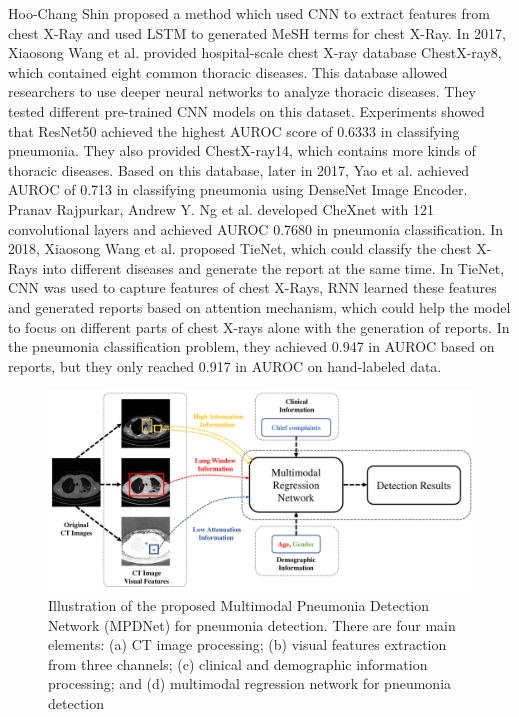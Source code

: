 \documentclass[journal]{IEEEtran}
\begin{document}
Hoo-Chang Shin \cite{Shin2016Learning} proposed a method which used CNN to extract features from chest X-Ray and used LSTM \cite{hochreiter1997long} to generated MeSH \cite{timmurphy.org} terms for chest X-Ray. In 2017, Xiaosong Wang et al. \cite{Wang2017ChestX} provided hospital-scale chest X-ray database ChestX-ray8, which contained eight common thoracic diseases. This database allowed researchers to use deeper neural networks to analyze thoracic diseases. They tested different pre-trained CNN models on this dataset. Experiments showed that ResNet50 achieved the highest AUROC score of 0.6333 in classifying pneumonia. They also provided ChestX-ray14, which contains more kinds of thoracic diseases.
Based on this database, later in 2017, Yao et al. \cite{yao2017learning} achieved AUROC of 0.713 in classifying pneumonia using DenseNet Image Encoder. Pranav Rajpurkar, Andrew Y. Ng et al. \cite{Rajpurkar2017CheXNet} developed CheXnet with 121 convolutional layers and achieved AUROC 0.7680 in pneumonia classification.
In 2018, Xiaosong Wang et al. \cite{Wang2018TieNet} proposed TieNet, which could classify the chest X-Rays into different diseases and generate the report at the same time. In TieNet, CNN was used to capture features of chest X-Rays, RNN learned these features and generated reports based on attention mechanism, which could help the model to focus on different parts of chest X-rays alone with the generation of reports. In the pneumonia classification problem, they achieved 0.947 in AUROC based on reports, but they only reached 0.917 in AUROC on hand-labeled data. 
\begin{figure}[htbp]
    \label{Illustration}
    \centerline{\includegraphics[width=160mm]{new1.pdf}}
    \vspace{-0cm}
    \caption{Illustration of the proposed Multimodal Pneumonia Detection Network (MPDNet) for pneumonia detection. There are four main elements: (a) CT image processing; (b) visual features extraction from three channels; (c) clinical and demographic information processing; and (d) multimodal regression network for pneumonia detection}
    \vspace{-0cm}
    \end{figure}
\end{document}
